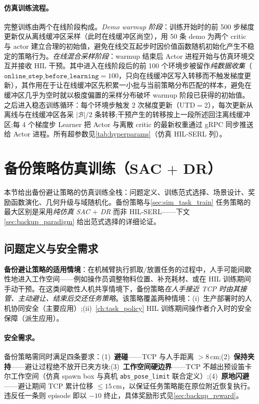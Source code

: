 \paragraph{仿真训练流程。}完整训练由两个在线阶段构成。\emph{Demo warmup 阶段}：训练开始时的前 500 步梯度更新仅从离线缓冲区采样（此时在线缓冲区尚空），用 50 条 demo 为两个 critic 与 actor 建立合理的初始值，避免在线交互起步时因价值函数随机初始化产生不稳定的策略行为。\emph{在线混合采样阶段}：warmup 结束后 Actor 进程开始与仿真环境交互并接收 HIL 干预。其中进入在线阶段后的前 100 个环境步被留作\emph{纯数据收集}（$\texttt{online\_step\_before\_learning}=100$，只向在线缓冲区写入转移而不触发梯度更新），其作用在于让在线缓冲区先积累一小批与当前策略分布匹配的样本，避免在缓冲区几乎为空时就以极度偏置的采样分布破坏 warmup 阶段已获得的初始值。之后进入稳态训练循环：每个环境步触发 2 次梯度更新（$\text{UTD}=2$），每次更新从离线与在线缓冲区各采 $|\mathcal{B}|/2$ 条转移;干预产生的转移按上一段所述回注离线缓冲区;每 4 个梯度步 Learner 把 Actor 与离散 critic 的最新权重通过 gRPC 同步推送给 Actor 进程。所有超参数见\cref{tab:hyperparams}（仿真 HIL-SERL 列）。

\section{备份策略仿真训练（SAC $+$ DR）}\label{sec:backup_sim_train}

本节给出备份避让策略的仿真训练全栈：问题定义、训练范式选择、场景设计、奖励函数演化、几何升级与域随机化。备份策略与\cref{sec:sim_task_train} 任务策略的最大区别是采用\emph{纯仿真 SAC $+$ DR} 而非 HIL-SERL——下文 \cref{sec:backup_paradigm} 给出范式选择的详细论证。

\subsection{问题定义与安全需求}\label{sec:backup_problem}

\textbf{备份避让策略的适用情境}：在机械臂执行抓取/放置任务的过程中，人手可能间歇性地进入工作空间——例如操作员调整物料位置、补充耗材、或在 HIL 训练期间手动干预。在这类间歇性人机共享情境下，备份策略\emph{在人手接近 TCP 时由其接管、主动避让、结束后交还任务策略}。该策略覆盖两种情境：(i)~生产部署时的人机协同安全（主要应用）;(ii)~\cref{ch:task_policy} HIL 训练期间操作者介入时的安全保障（派生应用）。

\paragraph{安全需求。}备份策略需同时满足四条要求：(1)~\textbf{避碰}——TCP 与人手距离 $> 8\,\text{cm}$;(2)~\textbf{保持夹持}——避让过程绝不放开已夹方块;(3)~\textbf{工作空间硬边界}——TCP 不越出预设笛卡尔工作空间（仿真 spawn box 与真机 \texttt{abs\_pose\_limit} 联合定义）;(4)~\textbf{原地闪避}——避让期间 TCP 累计位移 $\leq 15\,\text{cm}$，以保证任务策略能在原位附近恢复执行。违反任一条则 episode 即以 $-10$ 终止，具体奖励形式见\cref{sec:backup_reward}。

